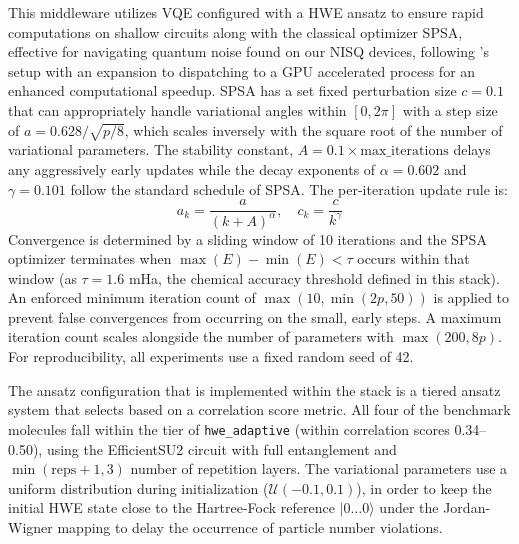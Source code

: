 This middleware utilizes VQE configured with a HWE ansatz to ensure rapid computations on shallow circuits along with the classical optimizer SPSA, 
effective for navigating quantum noise found on our NISQ devices, following \textcite{kandala2017hardware}'s setup with an expansion to dispatching to a GPU accelerated process for an enhanced computational speedup.  
SPSA has a set fixed perturbation size $c = 0.1$ that can appropriately handle variational 
angles within $[0,2\pi]$ with a step size of $a=0.628 / \sqrt{p/8}$, which scales inversely with the square root of the 
number of variational parameters. The stability constant, $A = 0.1 \times \text{max\_iterations}$ delays any aggressively early 
updates while the decay exponents of $\alpha= 0.602$ and $\gamma = 0.101$ follow the standard schedule of SPSA. The per-iteration update rule is:
\begin{equation}
    a_k = \frac{a}{(k + A)^\alpha}, \quad c_k = \frac{c}{k^\gamma}
\end{equation}
Convergence is determined by a sliding window of 10 iterations and the SPSA optimizer terminates when $\max(E)-\min(E) < \tau$ occurs 
within that window (as $\tau = 1.6$ mHa, the chemical accuracy threshold defined in this stack). An enforced minimum iteration count of $\max(10, \min(2p, 50))$ 
is applied to prevent false convergences from occurring on the small, early steps. A maximum iteration count scales alongside 
the number of parameters with $\max(200, 8p)$. For reproducibility, all experiments use a fixed random seed of 42. 

The ansatz configuration that is implemented within the stack is a tiered ansatz system that selects based on a correlation 
score metric. All four of the benchmark molecules fall within the tier of \texttt{hwe\_adaptive} (within correlation scores 0.34--0.50), 
using the EfficientSU2 circuit with full entanglement and $\min(\text{reps}+1, 3)$ number of repetition layers. The variational 
parameters use a uniform distribution during initialization ($\mathcal{U}(-0.1, 0.1)$), in order to keep the initial HWE 
state close to the Hartree-Fock reference $|0\ldots0\rangle$ under the Jordan-Wigner mapping to delay the occurrence of particle number violations.  

